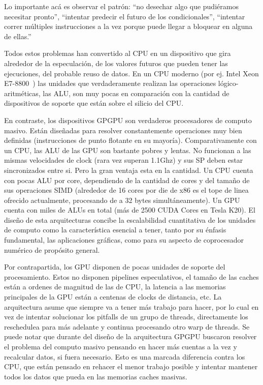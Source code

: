 Lo importante ac\'a es observar el patr\'on: ``no desechar algo que pudi\'eramos necesitar pronto'',
``intentar predecir el futuro de los condicionales'', ``intentar correr m\'ultiples instrucciones a la vez
porque puede llegar a bloquear en alguna de ellas.''

Todos estos problemas han convertido al CPU en un dispositivo que gira alrededor de la especulaci\'on,
de los valores futuros que pueden tener las ejecuciones, del probable reuso de datos.
En un CPU moderno (por ej. Intel Xeon E7-8800~\cite{XeonE78800Spec}) las unidades que verdaderamente realizan las operaciones l\'ogico-aritm\'eticas,
las ALU, son muy pocas en comparaci\'on con la cantidad de dispositivos de soporte que est\'an
sobre el silicio del CPU.

En contraste, los dispositivos GPGPU son verdaderos procesadores de computo masivo. Est\'an dise\~nadas para
resolver constantemente operaciones muy bien definidas (instrucciones de punto flotante en su mayor\'ia).
Comparativamente con un CPU, las ALU de las GPU son bastante pobres y lentas. No funcionan a las mismas
velocidades de clock (rara vez superan 1.1Ghz) y sus SP deben estar sincronizados entre si. Pero la gran ventaja esta en la cantidad.
Un CPU cuenta con pocas ALU por core, dependiendo de la cantidad de cores y del tama\~no de sus operaciones SIMD
(alrededor de 16 cores por die de x86 es el tope de linea ofrecido actualmente, procesando de a 32 bytes simult\'aneamente).
Un GPU cuenta con miles de ALUs en total (m\'as de 2500 CUDA Cores en Tesla K20). El dise\~no de esta
arquitecturas concibe la escalabilidad cuantitativa de los unidades de computo como la caracter\'istica esencial a tener,
tanto por su \'enfasis fundamental, las aplicaciones gr\'aficas, como para su aspecto de coprocesador num\'erico
de prop\'osito general.

Por contrapartida, los GPU disponen de pocas unidades de soporte del procesamiento. Estos no disponen pipelines
especulativos, el tama\~no de las caches est\'an a ordenes de magnitud de las de CPU, la latencia a las memorias
principales de la GPU est\'an a centenas de clocks de distancia, etc. La arquitectura asume que siempre va a tener m\'as trabajo
para hacer, por lo cual en vez de intentar solucionar los pitfalls de un grupo de threads, directamente
los reschedulea para m\'as adelante y continua procesando otro warp de threads. Se puede notar que durante del
dise\~no de la arquitectura GPGPU buscaron resolver el problema del computo masivo pensando en hacer
m\'as cuentas a la vez y recalcular datos, si fuera necesario. Esto es una marcada diferencia contra
los CPU, que est\'an pensado en rehacer el menor trabajo posible y intentar mantener todos los datos que pueda en
las memorias caches masivas.

